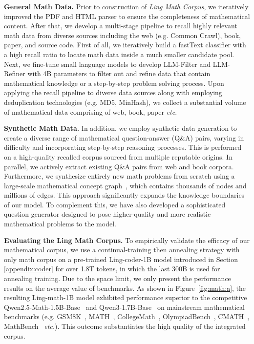 {\bfseries General Math Data. }
Prior to construction of \emph{Ling Math Corpus}, we iteratively improved the PDF and HTML parser to ensure the completeness of mathematical content. After that, we develop a multi-stage pipeline to recall highly relevant math data from diverse sources including the web (e.g. Common Crawl), book, paper, and source code. First of all, we iteratively build a fastText classifier with a high recall ratio to locate math data inside a much smaller candidate pool. Next, we fine-tune small language models to develop LLM-Filter and LLM-Refiner with 4B parameters to filter out and refine data that contain mathematical knowledge or a step-by-step problem solving process. Upon applying the recall pipeline to diverse data sources along with employing deduplication technologies (e.g. MD5, MinHash), we collect a substantial volume of mathematical data comprising of web, book, paper \emph{etc}.

{\bfseries Synthetic Math Data. }
In addition, we employ synthetic data generation to create a diverse range of mathematical question-answer (Q\&A) pairs, varying in difficulty and incorporating step-by-step reasoning processes. This is performed on a high-quality recalled corpus sourced from multiple reputable origins. In parallel, we actively extract existing Q\&A pairs from web and book corpora. Furthermore, we synthesize entirely new math problems from scratch using a large-scale mathematical concept graph~\citep{chen2025arrows}, which contains thousands of nodes and millions of edges. This approach significantly expands the knowledge boundaries of our model. To complement this, we have also developed a sophisticated question generator designed to pose higher-quality and more realistic mathematical problems to the model.

{\bfseries Evaluating the Ling Math Corpus. }
To empirically validate the efficacy of our mathematical corpus, we use a continual-training then annealing strategy with only math corpus on a pre-trained Ling-coder-1B model introduced in Section \ref{appendix:coder} for over 1.8T tokens, in which the last 300B is used for annealing training. Due to the space limit, we only present the performance results on the average value of benchmarks. As shown in Figure~\ref{fig:math:a}, the resulting Ling-math-1B model exhibited performance superior to the competitive Qwen2.5-Math-1.5B-Base~\citep{yang2024qwen25mathtechnicalreportmathematical} and Qwen3-1.7B-Base~\citep{qwen3} on mainstream mathematical benchmarks (e.g. GSM8K~\citep{gsm8k}, MATH~\citep{math}, CollegeMath~\citep{college-math}, OlympiadBench~\citep{olympiadbench}, CMATH~\citep{cmath}, MathBench~\citep{mathbench} \emph{etc.}). This outcome substantiates the high quality of the integrated corpus.

